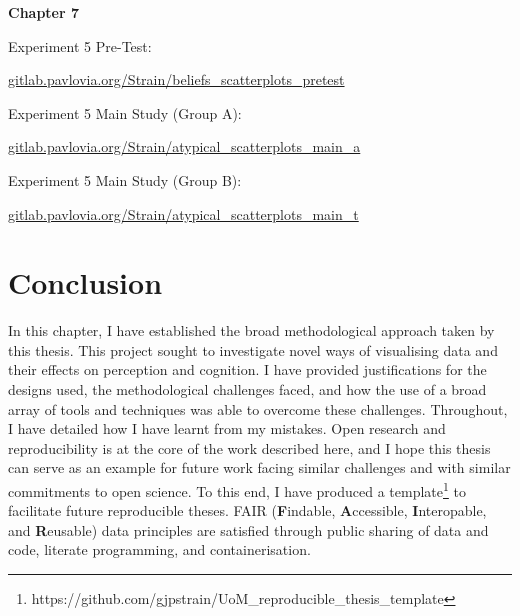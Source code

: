 \documentclass[../main.tex]{subfiles}
\begin{document}
\textbf{Chapter 7}

Experiment 5 Pre-Test:

\href{https://gitlab.pavlovia.org/Strain/beliefs_scatterplots_pretest}{gitlab.pavlovia.org/Strain/beliefs\_scatterplots\_pretest}

Experiment 5 Main Study (Group A):

\href{https://gitlab.pavlovia.org/Strain/atypical_scatterplots_main_a}{gitlab.pavlovia.org/Strain/atypical\_scatterplots\_main\_a}

Experiment 5 Main Study (Group B):

\href{https://gitlab.pavlovia.org/Strain/atypical_scatterplots_main_t}{gitlab.pavlovia.org/Strain/atypical\_scatterplots\_main\_t}

\section{Conclusion}\label{conclusion}

In this chapter, I have established the broad methodological approach
taken by this thesis. This project sought to investigate novel ways of
visualising data and their effects on perception and cognition. I have
provided justifications for the designs used, the methodological
challenges faced, and how the use of a broad array of tools and
techniques was able to overcome these challenges. Throughout, I have
detailed how I have learnt from my mistakes. Open research and
reproducibility is at the core of the work described here, and I hope
this thesis can serve as an example for future work facing similar
challenges and with similar commitments to open science. To this end, I
have produced a template\footnote{https://github.com/gjpstrain/UoM\_reproducible\_thesis\_template}
to facilitate future reproducible theses. FAIR (\textbf{F}indable,
\textbf{A}ccessible, \textbf{I}nteropable, and \textbf{R}eusable) data
principles \cite{wilkinson_2016} are satisfied through public sharing of
data and code, literate programming, and containerisation.
\end{document}
